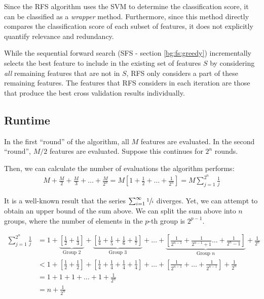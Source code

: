 \documentclass[12pt, twoside, a4paper]{report}
\begin{document}
Since the RFS algorithm uses the SVM to determine the classification score, it can be classified as a \textit{wrapper} method. Furthermore, since this method directly compares the classification score of each subset of features, it does not explicitly quantify relevance and redundancy.

While the sequential forward search (SFS - section \ref{bg:fs:greedy}) incrementally selects the best feature to include in the existing set of features $S$ by considering \textit{all} remaining features that are not in $S$, RFS only considers a part of these remaining features. The features that RFS considers in each iteration are those that produce the best cross validation results individually.


\subsection{Runtime}
In the first ``round'' of the algorithm, all $M$ features are evaluated. In the second ``round'', $M/2$ features are evaluated. Suppose this continues for $2^n$ rounds.

Then, we can calculate the number of evaluations the algorithm performs:
\begin{align*}
M+\frac{M}{2}+\frac{M}{3}+\dots+\frac{M}{2^n} = M\left[ 1+\frac{1}{2}+\dots+\frac{1}{2^n} \right]=M \sum_{j=1}^{2^n} \frac{1}{j}
\end{align*}

It is a well-known result that the series $\sum_{i=1}^{\infty} \sfrac{1}{i}$ diverges. Yet, we can attempt to obtain an upper bound of the sum above. We can split the sum above into $n$ groups, where the number of elements in the $p$-th group is $2^{p-1}$.

\begin{align*}
\sum_{j=1}^{2^n} \frac{1}{j}
&= 1 + \underbrace{\left[ \frac{1}{2} + \frac{1}{3} \right]}_{\text{Group 2}} + \underbrace{\left[ \frac{1}{4} + \frac{1}{5} + \frac{1}{6} + \frac{1}{7} \right]}_{\text{Group 3}} + \dots + \underbrace{\left[ \frac{1}{2^{n-1}} + \frac{1}{2^{n-1}+1} \dots + \frac{1}{2^{n}-1} \right]}_{\text{Group $n$}} + \frac{1}{2^n} \\
&< 1 + \left[ \frac{1}{2} + \frac{1}{2} \right] + \left[ \frac{1}{4} + \frac{1}{4} + \frac{1}{4} + \frac{1}{4} \right] + \dots + \left[ \frac{1}{2^{n-1}} + \dots + \frac{1}{2^{n-1}} \right] + \frac{1}{2^n} \\
&= 1+1+1+ \dots + 1 + \frac{1}{2^n} \\
&= n + \frac{1}{2^n}
\end{align*}
\end{document}
